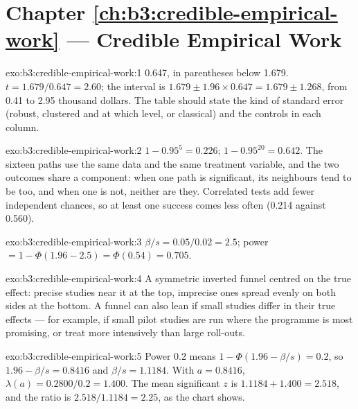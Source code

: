 \section*{Chapter \ref{ch:b3:credible-empirical-work} --- Credible Empirical Work}

\begin{solution}{exo:b3:credible-empirical-work:1}
0.647, in parentheses below 1.679. %
$t = 1.679/0.647 = 2.60$; the interval is $1.679 \pm 1.96 \times 0.647 = 1.679 \pm
1.268$, from 0.41 to 2.95 thousand dollars. The table should state the kind of
standard error (robust, clustered and at which level, or classical) and the
controls in each column.
\end{solution}

\begin{solution}{exo:b3:credible-empirical-work:2}
$1 - 0.95^5 = 0.226$; $1 - 0.95^{20} = 0.642$. The sixteen paths use the same data
and the same treatment variable, and the two outcomes share a component: when
one path is significant, its neighbours tend to be too, and when one is not,
neither are they. Correlated tests add fewer independent chances, so at least one
success comes less often (0.214 against 0.560). %
\end{solution}

\begin{solution}{exo:b3:credible-empirical-work:3}
$\beta/s = 0.05/0.02 = 2.5$; power $= 1 - \Phi(1.96 - 2.5) = \Phi(0.54) = 0.705$.
\end{solution}

\begin{solution}{exo:b3:credible-empirical-work:4}
A symmetric inverted funnel centred on the true effect: precise studies near
it at the top, imprecise ones spread evenly on both sides at the bottom. A funnel
can also lean if small studies differ in their true effects --- for example, if
small pilot studies are run where the programme is most promising, or treat
more intensively than large roll-outs.
\end{solution}

\begin{solution}{exo:b3:credible-empirical-work:5}
Power 0.2 means $1 - \Phi(1.96 - \beta/s) = 0.2$, so $1.96 - \beta/s = 0.8416$ and
$\beta/s = 1.1184$. With $a = 0.8416$, $\lambda(a) = 0.2800/0.2 = 1.400$. The mean
significant $z$ is $1.1184 + 1.400 = 2.518$, and the ratio is $2.518/1.1184 =
2.25$, as the chart shows. %
\end{solution}

